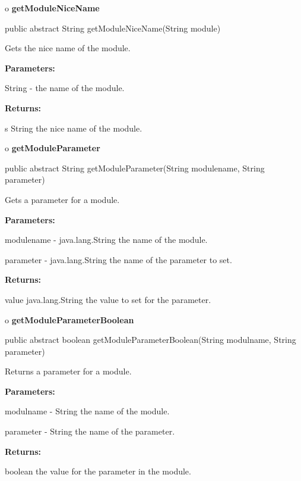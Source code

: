 o {\bf getModuleNiceName} 

\begin{PRE}
 public abstract String getModuleNiceName(String module)
\end{PRE}

\begin{description}
\htmlDD Gets the nice name of the module. 

\begin{description}
\item {\bf Parameters:}  

String - the name of the module.  
\item {\bf Returns:}  

s String the nice name of the module.  
\end{description}

\end{description}

o {\bf getModuleParameter} 

\begin{PRE}
 public abstract String getModuleParameter(String modulename,
                                           String parameter)
\end{PRE}

\begin{description}
\htmlDD Gets a parameter for a module. 

\begin{description}
\item {\bf Parameters:}  

modulename - java.lang.String the name of the module.  

parameter - java.lang.String the name of the parameter to set.  
\item {\bf Returns:}  

value java.lang.String the value to set for the parameter.  
\end{description}

\end{description}

o {\bf getModuleParameterBoolean} 

\begin{PRE}
 public abstract boolean getModuleParameterBoolean(String modulname,
                                                   String parameter)
\end{PRE}

\begin{description}
\htmlDD Returns a parameter for a module. 

\begin{description}
\item {\bf Parameters:}  

modulname - String the name of the module.  

parameter - String the name of the parameter.  
\item {\bf Returns:}  

boolean the value for the parameter in the module.  
\end{description}

\end{description}

